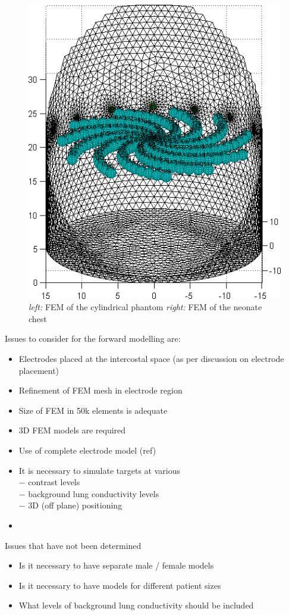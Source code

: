 \documentclass[12pt]{iopart}
\begin{document}
\begin{figure}[bhtp]
\begin{center}
  \includegraphics[width= 0.4 \textwidth, bb=0 0 444 517]
         {../../tutorial/GREIT-evaluation/simulation_3d_test02a.png}

\caption{ \label{fig:fm2}
{\em left:} FEM of the cylindrical phantom
{\em right:} FEM of the neonate chest 
}
\end{center}
\end{figure}

Issues to consider for the forward modelling are:
\begin{itemize}
\item
Electrodes placed at the intercostal space
(as per discussion on electrode placement)
\item
Refinement of FEM mesh in electrode region
\item
Size of FEM in 50k elements is adequate
\item
3D FEM models are required
\item
Use of complete electrode model (ref)
\item
It is necessary to simulate targets at various
\\ $-$ contrast levels
\\ $-$ background lung conductivity levels
\\ $-$ 3D (off plane) positioning
\item
\end{itemize}

Issues that have not been determined
\begin{itemize}
\item
Is it necessary to have separate male / female models
\item
Is it necessary to have models for different patient sizes
\item
What levels of background lung conductivity should be included
\end{itemize}
\end{document}
